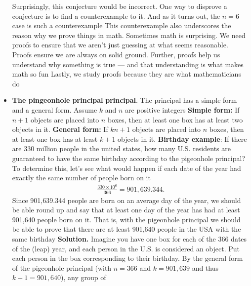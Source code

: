 \documentclass{report}
\begin{document}
\begin{itemize}
            \bigbreak \noindent 
            Surprisingly, this conjecture would be incorrect. One way to disprove a conjecture is to find a counterexample to it. And as it turns out, the $n = 6$ case is such a counterexample
            \bigbreak \noindent 
            \bigbreak \noindent 
            This counterexample also underscores the reason why we prove things in math. Sometimes math is surprising. We need proofs to ensure that we aren’t just guessing at what seems reasonable. Proofs ensure we are always on solid ground. Further, proofs help us understand why something is true — and that understanding is what makes math so fun
            \bigbreak \noindent 
            Lastly, we study proofs because they are what mathematicians do
        \item \textbf{The pingeonhole principal}
            \bigbreak \noindent 
            \textbf{principal}. The principal has a simple form and a general form. Assume $k$ and $n$ are positive integers
            \bigbreak \noindent 
            \textbf{Simple form:} If $n + 1$ objects are placed into $n$ boxes, then at least one box has at least two objects in it.
            \bigbreak \noindent 
        \textbf{General form:} If $kn + 1$ objects are placed into $n$ boxes, then at least one box has at least $k + 1$ objects in it.
            \bigbreak \noindent 
            \textbf{Birthday example}: If there are 330 million people in the united states, how many U.S. residents are guaranteed to have the same birthday according to the pigeonhole principal?
            \bigbreak \noindent 
            To determine this, let’s see what would happen if each date of the year had exactly the same number of people born on it
            \begin{align*}
                \frac{330\times10^{6}}{366} = 901,639.344
            .\end{align*}
            \bigbreak \noindent 
            Since 901,639.344 people are born on an average day of the year, we should be able round up and say that at least one day of the year has had at least 901,640 people born on it. That is, with the pigeonhole principal we should be able to prove that there are at least 901,640 people in the USA with the same birthday
            \bigbreak \noindent 
            \textbf{Solution.} Imagine you have one box for each of the 366 dates of the (leap) year, and each person in the U.S. is considered an object. Put each person in the box corresponding to their birthday. By the general form of the pigeonhole principal (with $n = 366$ and $k = 901, 639$ and thus $k + 1 = 901, 640$), any group of

\end{itemize}
\end{document}
